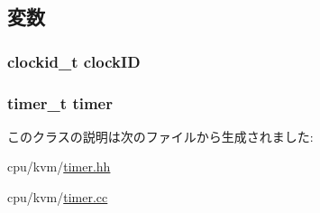 \subsection{変数}
\hypertarget{classPosixKvmTimer_a3ad1d5e961d76190ddbf7559f642a11e}{
\subsubsection[{clockID}]{\setlength{\rightskip}{0pt plus 5cm}clockid\_\-t {\bf clockID}}}
\label{classPosixKvmTimer_a3ad1d5e961d76190ddbf7559f642a11e}
\hypertarget{classPosixKvmTimer_a1a1e2de3a80567484c9b4d4f20d5a3d0}{
\subsubsection[{timer}]{\setlength{\rightskip}{0pt plus 5cm}timer\_\-t {\bf timer}}}
\label{classPosixKvmTimer_a1a1e2de3a80567484c9b4d4f20d5a3d0}


このクラスの説明は次のファイルから生成されました:\begin{DoxyCompactItemize}
\item 
cpu/kvm/\hyperlink{timer_8hh}{timer.hh}\item 
cpu/kvm/\hyperlink{timer_8cc}{timer.cc}\end{DoxyCompactItemize}
